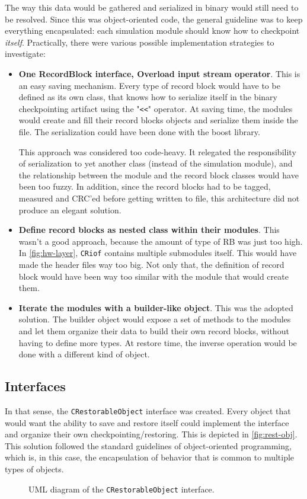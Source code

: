{The way this data would be gathered and serialized in binary would still need to be resolved. Since this was object-oriented code, the general guideline was to keep everything encapsulated: each simulation module should know how to checkpoint \textit{itself}. Practically, there were various possible implementation strategies to investigate:
\begin{itemize}
	\item \textbf{One RecordBlock interface, Overload input stream operator}. This is an easy saving mechanism. Every type of record block would have to be defined as its own class, that knows how to serialize itself in the binary checkpointing artifact using the "\texttt{<<}" operator. At saving time, the modules would create and fill their record blocks objects and serialize them inside the file. The serialization could have been done with the boost library\cite{online:boost}.
	
	This approach was considered too code-heavy. It relegated the responsibility of serialization to yet another class (instead of the simulation module), and the relationship between the module and the record block classes would have been too fuzzy. In addition, since the record blocks had to be tagged, measured and CRC'ed before getting written to file, this architecture did not produce an elegant solution. 
	\item \textbf{Define record blocks as nested class within their modules}. This wasn't a good approach, because the amount of type of RB was just too high. In \autoref{fig:hw-layer}, \texttt{CRiof} contains multiple submodules itself. This would have made the header files way too big. Not only that, the definition of record block would have been way too similar with the module that would create them. 
	\item \textbf{Iterate the modules with a builder-like object}. This was the adopted solution. The builder object would expose a set of methods to the modules and let them organize their data to build their own record blocks, without having to define more types. At restore time, the inverse operation would be done with a different kind of object.
\end{itemize}

\subsection*{\Cpp Interfaces}
In that sense, the \texttt{CRestorableObject} interface was created. Every object that would want the ability to save and restore itself could implement the interface and organize their own checkpointing/restoring. This is depicted in \autoref{fig:rest-obj}. This solution followed the standard guidelines of object-oriented programming, which is, in this case, the encapsulation of behavior that is common to multiple types of objects. 
\begin{figure}[htbp]
	\centering
	\vspace{12pt}
	\footnotesize
	
	\caption{UML diagram of the \texttt{CRestorableObject} interface.}
	\label{fig:rest-obj}
\end{figure}

}
